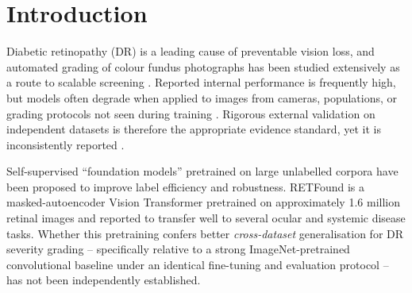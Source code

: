 \documentclass[11pt,a4paper]{article}
\newcommand{\prov}[1]{#1\textsuperscript{\textcolor{blue}{p}}} %
\begin{document}
\begin{abstract}
baseline's (difference \prov{\num{0.124}}, 95\% CI \numrange{0.074}{0.175} for
full fine-tuning; \num{0.076}, 95\% CI \numrange{0.019}{0.132} for linear
probing), and the baseline had a significantly higher referable-DR AUC on both
external datasets (DeLong $p<\num{0.001}$) despite being indistinguishable from
all models internally ($p\geq\num{0.47}$). CNN saliency remained lesion-focused
on external images (75--100\% plausible by an automated proxy) whereas RETFound's
shifted to the image periphery on Messidor-2, most markedly for its errors.
Predictive entropy was a weak external error detector for every model (AUROC
\numrange{0.55}{0.68} vs.\ up to \num{0.84} internally); referring the
most-uncertain 10\% of external predictions captured only \numrange{10}{18}\% of
errors.
\textbf{Conclusions:} In this retrospective, public-dataset study, fine-tuning a
retinal foundation model on APTOS~2019 did not improve -- and by several measures
worsened -- cross-dataset generalisation for DR grading relative to a standard
ImageNet-pretrained CNN. Large internal-to-external performance drops for every
model, weak predictive uncertainty under shift, and shift-sensitive saliency
underline that external validation, not internal test performance, should govern
claims of clinical readiness.
\medskip

\noindent\textbf{Keywords:} diabetic retinopathy; deep learning; foundation
models; RETFound; external validation; domain shift; explainable AI;
uncertainty quantification; retinal imaging
\end{abstract}

\section{Introduction}

Diabetic retinopathy (DR) is a leading cause of preventable vision loss, and
automated grading of colour fundus photographs has been studied extensively as a
route to scalable screening \citep{gulshan2016,ting2017}. Reported internal
performance is frequently high, but models often degrade when applied to images
from cameras, populations, or grading protocols not seen during training
\citep{beede2020,dai2021spectrum}. Rigorous external validation on independent
datasets is therefore the appropriate evidence standard, yet it is inconsistently
reported \citep{grzybowski2020review,tripodai2024}.

Self-supervised ``foundation models'' pretrained on large unlabelled corpora
have been proposed to improve label efficiency and robustness. RETFound
\citep{zhou2023retfound} is a masked-autoencoder Vision Transformer pretrained
on approximately 1.6 million retinal images and reported to transfer well to
several ocular and systemic disease tasks. Whether this pretraining confers
better \emph{cross-dataset} generalisation for DR severity grading --
specifically relative to a strong ImageNet-pretrained convolutional baseline
under an identical fine-tuning and evaluation protocol -- has not been
independently established.
\end{document}
